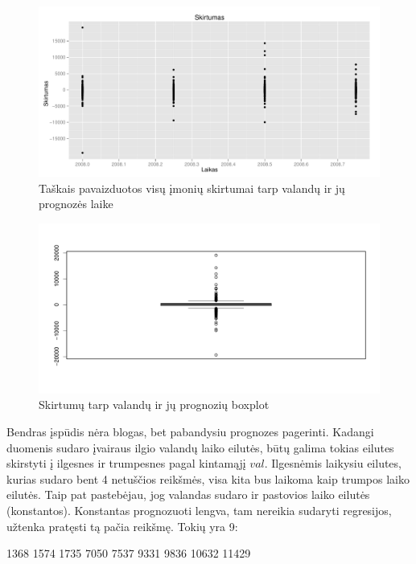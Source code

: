 \documentclass[a4paper]{article}
\begin{document}
\begin{figure}[here]
\includegraphics[width=\textwidth]{Skirtumas_zym.pdf}
\caption{Taškais pavaizduotos visų įmonių skirtumai tarp valandų ir
  jų prognozės laike}
\label{fig:skzym}
\end{figure}

\begin{figure}[here]
\includegraphics[width=\textwidth]{Skirtumas_zym_boxplot.pdf}
\caption{Skirtumų tarp valandų ir jų prognozių boxplot}
\label{fig:skzymb}
\end{figure}

Bendras įspūdis nėra blogas, bet pabandysiu prognozes
pagerinti. Kadangi duomenis sudaro įvairaus ilgio valandų laiko eilutės, būtų
galima tokias eilutes skirstyti į ilgesnes ir trumpesnes pagal
kintamąjį $val$. Ilgesnėmis laikysiu eilutes, kurias sudaro bent 4
netuščios reikšmės, visa kita bus laikoma kaip trumpos laiko eilutės. 
Taip pat pastebėjau, jog valandas sudaro ir pastovios
laiko eilutės (konstantos). Konstantas prognozuoti lengva, tam
nereikia sudaryti regresijos, užtenka pratęsti tą pačia reikšmę. Tokių
yra 9:
\begin{Schunk}
\begin{Soutput}
[1]  1368  1574  1735  7050  7537  9331  9836 10632 11429
\end{Soutput}
\end{Schunk}
\end{document}
